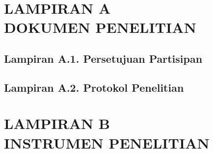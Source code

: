 \appendix
\chapter*{LAMPIRAN A \\ DOKUMEN PENELITIAN}
{}
\section*{Lampiran A.1. Persetujuan Partisipan}

\clearpage
\section*{Lampiran A.2. Protokol Penelitian}

\clearpage
\chapter*{LAMPIRAN B \\ INSTRUMEN PENELITIAN}
{}

